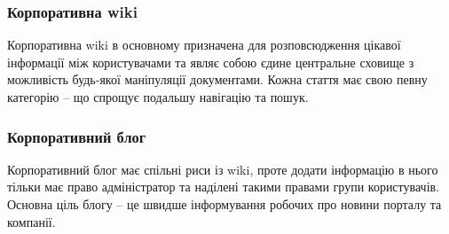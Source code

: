 \subsubsection{Корпоративна wiki}
\par Корпоративна wiki в основному призначена для розповсюдження цікавої інформації між користувачами та являє собою єдине центральне сховище з можливість будь-якої маніпуляції документами. Кожна стаття має свою певну категорію -- що спрощує подальшу навігацію та пошук.

\subsubsection{Корпоративний блог}
\par Корпоративний блог має спільні риси із wiki, проте додати інформацію в нього тільки має право адміністратор та наділені такими правами групи користувачів. Основна ціль блогу -- це швидше інформування робочих про новини порталу та компанії.
